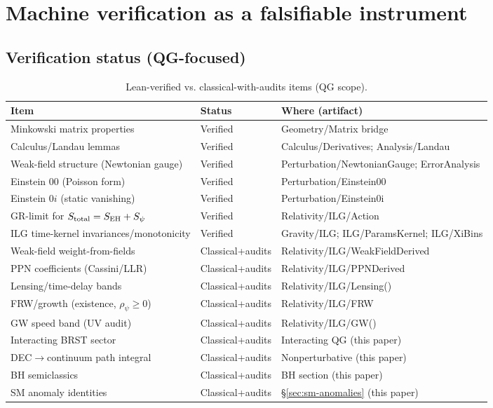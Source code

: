 \documentclass[11pt]{article}
\begin{document}
\section{Machine verification as a falsifiable instrument}\label{sec:verification-instrument}

\subsection*{Verification status (QG-focused)}
\begin{table}[htbp]
\centering
\small
\setlength{\tabcolsep}{6pt}
\caption{Lean-verified vs. classical-with-audits items (QG scope).}
\label{tab:qg-verification}
\begin{tabular}{l l l}
\toprule
\textbf{Item} & \textbf{Status} & \textbf{Where (artifact)} \\
\midrule
Minkowski matrix properties & Verified & Geometry/Matrix bridge \\
Calculus/Landau lemmas & Verified & Calculus/Derivatives; Analysis/Landau \\
Weak-field structure (Newtonian gauge) & Verified & Perturbation/NewtonianGauge; ErrorAnalysis \\
Einstein $00$ (Poisson form) & Verified & Perturbation/Einstein00 \\
Einstein $0i$ (static vanishing) & Verified & Perturbation/Einstein0i \\
GR-limit for $S_{\rm total}=S_{\rm EH}+S_\psi$ & Verified & Relativity/ILG/Action \\
ILG time-kernel invariances/monotonicity & Verified & Gravity/ILG; ILG/ParamsKernel; ILG/XiBins \\
Weak-field weight-from-fields & Classical+audits & Relativity/ILG/WeakFieldDerived \\
PPN coefficients (Cassini/LLR) & Classical+audits & Relativity/ILG/PPNDerived \\
Lensing/time-delay bands & Classical+audits & Relativity/ILG/Lensing(\*) \\
FRW/growth (existence, $\rho_\psi\!\ge\!0$) & Classical+audits & Relativity/ILG/FRW \\
GW speed band (UV audit) & Classical+audits & Relativity/ILG/GW(\*) \\
Interacting BRST sector & Classical+audits & Interacting QG (this paper) \\
DEC$\to$continuum path integral & Classical+audits & Nonperturbative (this paper) \\
BH semiclassics & Classical+audits & BH section (this paper) \\
SM anomaly identities & Classical+audits & \S\ref{sec:sm-anomalies} (this paper) \\
\bottomrule
\end{tabular}
\end{table}
\end{document}
